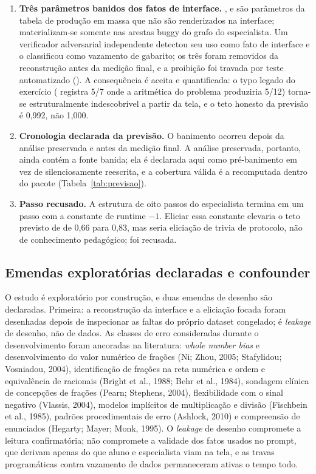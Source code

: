 \documentclass[11pt,a4paper]{article}
\begin{document}
\begin{enumerate}
  \item \textbf{Três parâmetros banidos dos fatos de interface.} ,  e  são parâmetros da tabela de produção em massa que não são renderizados na interface; materializam-se somente nas arestas buggy do grafo do especialista. Um verificador adversarial independente detectou seu uso como fato de interface e o classificou como vazamento de gabarito; os três foram removidos da reconstrução antes da medição final, e a proibição foi travada por teste automatizado (). A consequência é aceita e quantificada: o typo legado do exercício  ( registra 5/7 onde a aritmética do problema produziria 5/12) torna-se estruturalmente indescobrível a partir da tela, e o teto honesto da previsão é 0,992, não 1,000.
  \item \textbf{Cronologia declarada da previsão.} O banimento ocorreu depois da análise preservada e antes da medição final. A análise preservada, portanto, ainda contém a fonte banida; ela é declarada aqui como pré-banimento em vez de silenciosamente reescrita, e a cobertura válida é a recomputada dentro do pacote (Tabela~\ref{tab:previsao}).
  \item \textbf{Passo  recusado.} A estrutura de oito passos do especialista termina em um passo  com a constante de runtime $-1$. Eliciar essa constante elevaria o teto previsto de  de 0,66 para 0,83, mas seria eliciação de trivia de protocolo, não de conhecimento pedagógico; foi recusada.
\end{enumerate}

\subsection{Emendas exploratórias declaradas e confounder}
\label{sec:emendas}

O estudo é exploratório por construção, e duas emendas de desenho são declaradas. Primeira: a reconstrução da interface e a eliciação focada foram desenhadas depois de inspecionar as faltas do próprio dataset congelado; é \emph{leakage} de desenho, não de dados. As classes de erro consideradas durante o desenvolvimento foram ancoradas na literatura: \emph{whole number bias} e desenvolvimento do valor numérico de frações (Ni; Zhou, 2005; Stafylidou; Vosniadou, 2004), identificação de frações na reta numérica e ordem e equivalência de racionais (Bright et al., 1988; Behr et al., 1984), sondagem clínica de concepções de frações (Pearn; Stephens, 2004), flexibilidade com o sinal negativo (Vlassis, 2004), modelos implícitos de multiplicação e divisão (Fischbein et al., 1985), padrões procedimentais de erro (Ashlock, 2010) e compreensão de enunciados (Hegarty; Mayer; Monk, 1995). O \emph{leakage} de desenho compromete a leitura confirmatória; não compromete a validade dos fatos usados no prompt, que derivam apenas do que aluno e especialista viam na tela, e as travas programáticas contra vazamento de dados permaneceram ativas o tempo todo.
\end{document}
